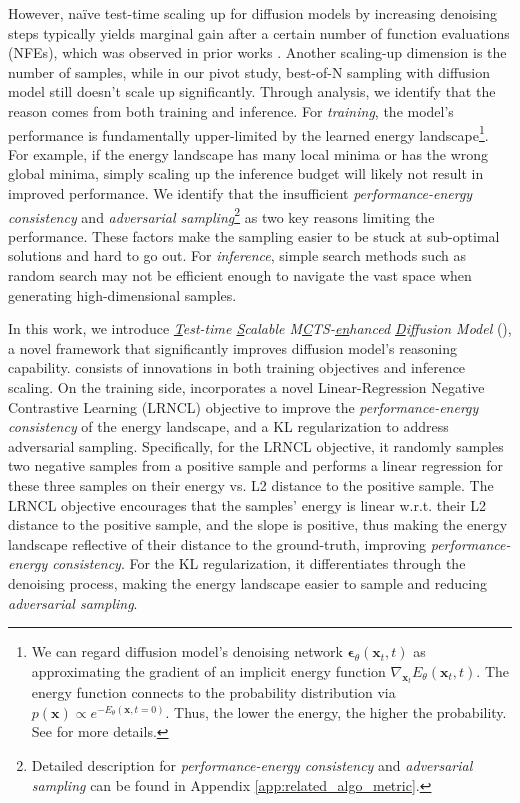 However, na\"ive test-time scaling up for diffusion models by increasing denoising steps typically yields marginal gain after a certain number of function evaluations (NFEs), which was observed in prior works \cite{karras2022elucidating,song2020denoising,song2021scorebased}. Another scaling-up dimension is the number of samples, while in our pivot study, best-of-N sampling with diffusion model still doesn't scale up significantly. Through analysis, we identify that the reason comes from both training and inference. For \emph{training}, the model's performance is fundamentally upper-limited by the learned energy landscape\footnote{We can regard diffusion model's denoising network $\boldsymbol\epsilon_\theta(\boldsymbol x_t,t)$ as approximating the gradient of an implicit energy function $\nabla_{\boldsymbol x_t}E_\theta(\boldsymbol x_t,t)$. The energy function connects to the probability distribution via $p(\boldsymbol x)\propto e^{-E_\theta(\boldsymbol x,t=0)}$. Thus, the lower the energy, the higher the probability. See \citet{du2023reduce} for more details.}. For example, if the energy landscape has many local minima or has the wrong global minima, simply scaling up the inference budget will likely not result in improved performance. We identify that the insufficient \emph{performance-energy consistency} and \emph{adversarial sampling}\footnote{Detailed description for \emph{performance-energy consistency} and \emph{adversarial sampling} can be found in Appendix \ref{app:related_algo_metric}.} as two key reasons limiting the performance. These factors make the sampling easier to be stuck at sub-optimal solutions and hard to go out. For \emph{inference}, simple search methods such as random search may not be efficient enough to navigate the vast space when generating high-dimensional samples. 

In this work, we introduce \emph{\underline{T}est-time \underline{S}calable M\underline{C}TS-\underline{en}hanced \underline{D}iffusion Model} (\proj), a novel framework that significantly improves diffusion model's reasoning capability. \proj consists of innovations in both training objectives and inference scaling. On the training side, \proj incorporates a novel Linear-Regression Negative Contrastive Learning (LRNCL) objective to improve the \emph{performance-energy consistency} of the energy landscape, and a KL regularization to address adversarial sampling. Specifically, for the LRNCL objective, it randomly samples two negative samples from a positive sample and performs a linear regression for these three samples on their energy vs. L2 distance to the positive sample. The LRNCL objective encourages that the samples' energy is linear w.r.t. their L2 distance to the positive sample, and the slope is positive, thus making the energy landscape reflective of their distance to the ground-truth, improving \emph{performance-energy consistency}. For the KL regularization, it differentiates through the denoising process, making the energy landscape easier to sample and reducing \emph{adversarial sampling}. 

